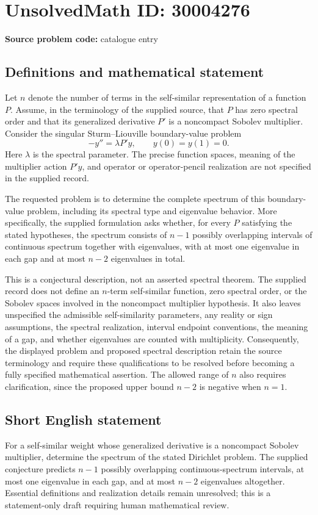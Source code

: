 \documentclass[11pt]{article}
\begin{document}
\section*{UnsolvedMath ID: 30004276}
\textbf{Source problem code:} catalogue entry
\subsection{Definitions and mathematical statement}
Let \(n\) denote the number of terms in the self-similar representation of a function \(P\). Assume, in the terminology of the supplied source, that \(P\) has zero spectral order and that its generalized derivative \(P'\) is a noncompact Sobolev multiplier. Consider the singular Sturm--Liouville boundary-value problem
\[
-y''=\lambda P'y,\qquad y(0)=y(1)=0.
\]
Here \(\lambda\) is the spectral parameter. The precise function spaces, meaning of the multiplier action \(P'y\), and operator or operator-pencil realization are not specified in the supplied record.

The requested problem is to determine the complete spectrum of this boundary-value problem, including its spectral type and eigenvalue behavior. More specifically, the supplied formulation asks whether, for every \(P\) satisfying the stated hypotheses, the spectrum consists of \(n-1\) possibly overlapping intervals of continuous spectrum together with eigenvalues, with at most one eigenvalue in each gap and at most \(n-2\) eigenvalues in total.

This is a conjectural description, not an asserted spectral theorem. The supplied record does not define an \(n\)-term self-similar function, zero spectral order, or the Sobolev spaces involved in the noncompact multiplier hypothesis. It also leaves unspecified the admissible self-similarity parameters, any reality or sign assumptions, the spectral realization, interval endpoint conventions, the meaning of a gap, and whether eigenvalues are counted with multiplicity. Consequently, the displayed problem and proposed spectral description retain the source terminology and require these qualifications to be resolved before becoming a fully specified mathematical assertion. The allowed range of \(n\) also requires clarification, since the proposed upper bound \(n-2\) is negative when \(n=1\).
\subsection{Short English statement}
For a self-similar weight whose generalized derivative is a noncompact Sobolev multiplier, determine the spectrum of the stated Dirichlet problem. The supplied conjecture predicts \(n-1\) possibly overlapping continuous-spectrum intervals, at most one eigenvalue in each gap, and at most \(n-2\) eigenvalues altogether. Essential definitions and realization details remain unresolved; this is a statement-only draft requiring human mathematical review.
\end{document}

